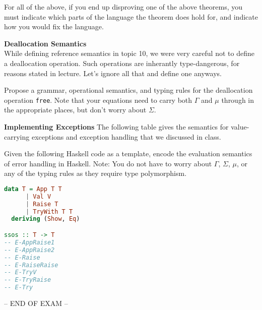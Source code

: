 \documentclass{exam}
\begin{document}
\begin{questions}
For all of the above, if you end up disproving one of the above theorems, you must indicate which parts of the language the theorem does hold for, and indicate how you would fix the language.

\question[10] \textbf{Deallocation Semantics} \\ 
While defining reference semantics in topic 10, we were very careful not to define a deallocation operation.  Such operations are inherantly type-dangerous, for reasons stated in lecture.  Let's ignore all that and define one anyways.  

Propose a grammar, operational semantics, and typing rules for the deallocation operation \texttt{free}.  Note that your equations need to carry both $\Gamma$ and $\mu$ through in the appropriate places, but don't worry about $\Sigma$.

\question[9] \textbf{Implementing Exceptions}
The following table gives the semantics for value-carrying exceptions and exception handling that we discussed in class.

Given the following Haskell code as a template, encode the evaluation semantics of error handling in Haskell.  Note: You do not have to worry about $\Gamma$, $\Sigma$, $\mu$, or any of the typing rules as they require type polymorphism.

\begin{lstlisting}[style=C, language=Haskell]
data T = App T T
      | Val V
      | Raise T 
      | TryWith T T
  deriving (Show, Eq)

ssos :: T -> T
-- E-AppRaise1
-- E-AppRaise2
-- E-Raise
-- E-RaiseRaise
-- E-TryV
-- E-TryRaise
-- E-Try
\end{lstlisting}

\end{questions}
\begin{center}
-- END OF EXAM --
\end{center}
\end{document}

